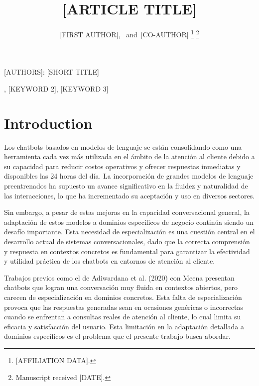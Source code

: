 \documentclass[journal]{IEEEtran}
\begin{document}
\title{[ARTICLE TITLE]}

\author{[FIRST AUTHOR],~
        and~[CO-AUTHOR]%
\thanks{[AFFILIATION DATA].}%
\thanks{Manuscript received [DATE].}}

%
{[AUTHORS]: [SHORT TITLE]}

\maketitle

\begin{abstract}
\end{abstract}

\begin{IEEEkeywords}
[KEYWORD 1], [KEYWORD 2], [KEYWORD 3]
\end{IEEEkeywords}

\IEEEpeerreviewmaketitle


\section{Introduction}
\label{sec:intro}

Los chatbots basados en modelos de lenguaje se están consolidando como una herramienta cada vez más utilizada en el ámbito de la atención al cliente debido a su capacidad para reducir costos operativos y ofrecer respuestas inmediatas y disponibles las 24 horas del día. La incorporación de grandes modelos de lenguaje preentrenados ha supuesto un avance significativo en la fluidez y naturalidad de las interacciones, lo que ha incrementado su aceptación y uso en diversos sectores.

Sin embargo, a pesar de estas mejoras en la capacidad conversacional general, la adaptación de estos modelos a dominios específicos de negocio continúa siendo un desafío importante. Esta necesidad de especialización es una cuestión central en el desarrollo actual de sistemas conversacionales, dado que la correcta comprensión y respuesta en contextos concretos es fundamental para garantizar la efectividad y utilidad práctica de los chatbots en entornos de atención al cliente.

Trabajos previos como el de Adiwardana et al. (2020) con Meena presentan chatbots que logran una conversación muy fluida en contextos abiertos, pero carecen de especialización en dominios concretos. Esta falta de especialización provoca que las respuestas generadas sean en ocasiones genéricas o incorrectas cuando se enfrentan a consultas reales de atención al cliente, lo cual limita su eficacia y satisfacción del usuario. Esta limitación en la adaptación detallada a dominios específicos es el problema que el presente trabajo busca abordar.
\end{document}
